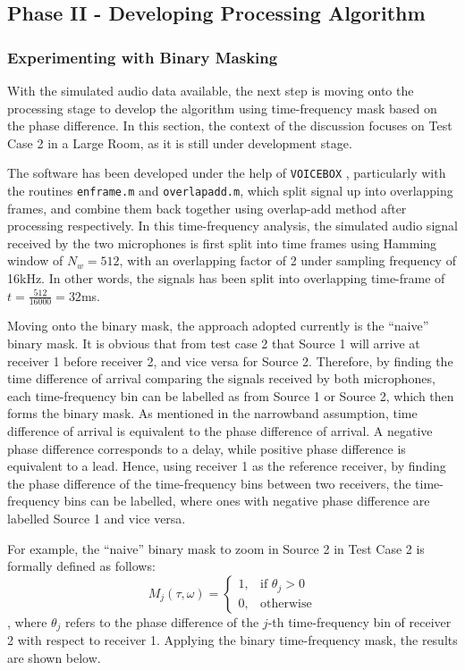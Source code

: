 \documentclass[a4paper,twoside,12pt,hidelinks]{article}
\begin{document}
\subsection{Phase II - Developing Processing Algorithm}
\subsubsection{Experimenting with Binary Masking}
With the simulated audio data available, the next step is moving onto the processing stage to develop the algorithm using time-frequency mask based on the phase difference. In this section, the context of the discussion focuses on Test Case 2 in a Large Room, as it is still under development stage.

The software has been developed under the help of \texttt{VOICEBOX} \cite{Brookes1997VOICEBOX:MATLAB.}, particularly with the routines \texttt{enframe.m} and \texttt{overlapadd.m}, which split signal up into overlapping frames, and combine them back together using overlap-add method after processing respectively. In this time-frequency analysis, the simulated audio signal received by the two microphones is first split into time frames using Hamming window of $N_w = 512$, with an overlapping factor of 2 under sampling frequency of 16kHz. In other words, the signals has been split into overlapping time-frame of $t=\frac{512}{16000}=32$ms.

Moving onto the binary mask, the approach adopted currently is the ``naive'' binary mask. It is obvious that from test case 2 that Source 1 will arrive at receiver 1 before receiver 2, and vice versa for Source 2. Therefore, by finding the time difference of arrival comparing the signals received by both microphones, each time-frequency bin can be labelled as from Source 1 or Source 2, which then forms the binary mask. As mentioned in the narrowband assumption, time difference of arrival is equivalent to the phase difference of arrival. A negative phase difference corresponds to a delay, while positive phase difference is equivalent to a lead. Hence, using receiver 1 as the reference receiver, by finding the phase difference of the time-frequency bins between two receivers, the time-frequency bins can be labelled, where ones with negative phase difference are labelled Source 1 and vice versa.

For example, the ``naive'' binary mask to zoom in Source 2 in Test Case 2 is formally defined as follows: 
\[
M_j(\tau,\omega) = \begin{cases} 1, & \text{if } \theta_j>0 \\ 0, & \text{otherwise} \end{cases}
\]
, where $\theta_j$ refers to the phase difference of the $j$-th time-frequency bin of receiver 2 with respect to receiver 1. Applying the binary time-frequency mask, the results are shown below.
\end{document}

